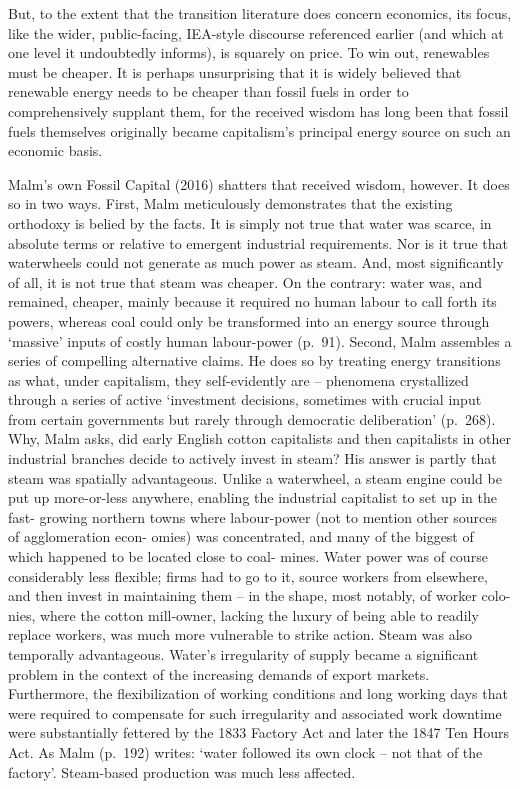 \documentclass[
]{book}
\begin{document}
But, to the extent that the transition literature does concern economics, its focus, like the wider,
public-facing, IEA-style discourse referenced earlier (and which at one level it undoubtedly informs),
is squarely on price. To win out, renewables must be cheaper.
It is perhaps unsurprising that it is widely believed that renewable energy needs to be cheaper
than fossil fuels in order to comprehensively supplant them, for the received wisdom has long
been that fossil fuels themselves originally became capitalism's principal energy source on such an
economic basis.

Malm's own Fossil Capital (2016) shatters that received wisdom, however. It does so in two ways.
First, Malm meticulously demonstrates that the existing orthodoxy is belied by the facts. It is simply
not true that water was scarce, in absolute terms or relative to emergent industrial requirements. Nor
is it true that waterwheels could not generate as much power as steam. And, most signiﬁcantly of all,
it is not true that steam was cheaper. On the contrary: water was, and remained, cheaper, mainly
because it required no human labour to call forth its powers, whereas coal could only be transformed
into an energy source through `massive' inputs of costly human labour-power (p.~91).
Second, Malm assembles a series of compelling alternative claims. He does so by treating energy
transitions as what, under capitalism, they self-evidently are -- phenomena crystallized through a
series of active `investment decisions, sometimes with crucial input from certain governments but
rarely through democratic deliberation' (p.~268). Why, Malm asks, did early English cotton capitalists
and then capitalists in other industrial branches decide to actively invest in steam?
His answer is partly that steam was spatially advantageous. Unlike a waterwheel, a steam engine
could be put up more-or-less anywhere, enabling the industrial capitalist to set up in the fast-
growing northern towns where labour-power (not to mention other sources of agglomeration econ-
omies) was concentrated, and many of the biggest of which happened to be located close to coal-
mines. Water power was of course considerably less ﬂexible; ﬁrms had to go to it, source workers
from elsewhere, and then invest in maintaining them -- in the shape, most notably, of worker colo-
nies, where the cotton mill-owner, lacking the luxury of being able to readily replace workers, was
much more vulnerable to strike action.
Steam was also temporally advantageous. Water's irregularity of supply became a signiﬁcant
problem in the context of the increasing demands of export markets. Furthermore, the ﬂexibilization
of working conditions and long working days that were required to compensate for such irregularity
and associated work downtime were substantially fettered by the 1833 Factory Act and later the
1847 Ten Hours Act. As Malm (p.~192) writes: `water followed its own clock -- not that of the
factory'. Steam-based production was much less aﬀected.
\end{document}
